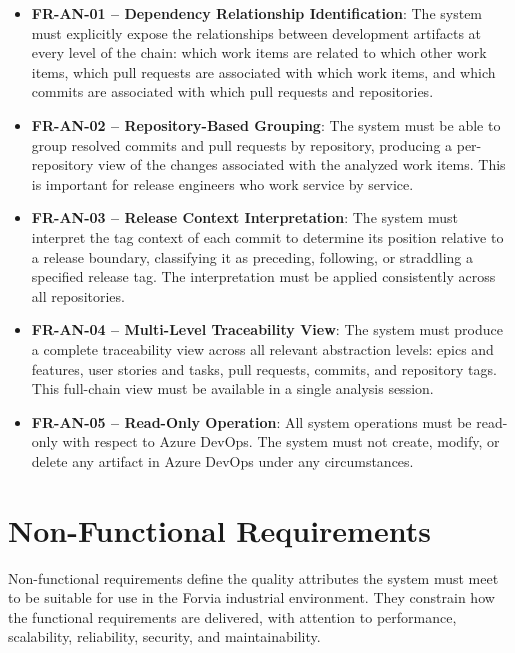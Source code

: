 \begin{itemize}
  \item \textbf{FR-AN-01 -- Dependency Relationship Identification}: The system must explicitly expose the relationships between development artifacts at every level of the chain: which work items are related to which other work items, which pull requests are associated with which work items, and which commits are associated with which pull requests and repositories.

  \item \textbf{FR-AN-02 -- Repository-Based Grouping}: The system must be able to group resolved commits and pull requests by repository, producing a per-repository view of the changes associated with the analyzed work items. This is important for release engineers who work service by service.

  \item \textbf{FR-AN-03 -- Release Context Interpretation}: The system must interpret the tag context of each commit to determine its position relative to a release boundary, classifying it as preceding, following, or straddling a specified release tag. The interpretation must be applied consistently across all repositories.

  \item \textbf{FR-AN-04 -- Multi-Level Traceability View}: The system must produce a complete traceability view across all relevant abstraction levels: epics and features, user stories and tasks, pull requests, commits, and repository tags. This full-chain view must be available in a single analysis session.

  \item \textbf{FR-AN-05 -- Read-Only Operation}: All system operations must be read-only with respect to Azure DevOps. The system must not create, modify, or delete any artifact in Azure DevOps under any circumstances.
\end{itemize}

\section{Non-Functional Requirements}
\label{sec:nonfunctional-requirements}

Non-functional requirements define the quality attributes the system must meet
to be suitable for use in the Forvia industrial environment. They constrain how
the functional requirements are delivered, with attention to performance,
scalability, reliability, security, and maintainability.

